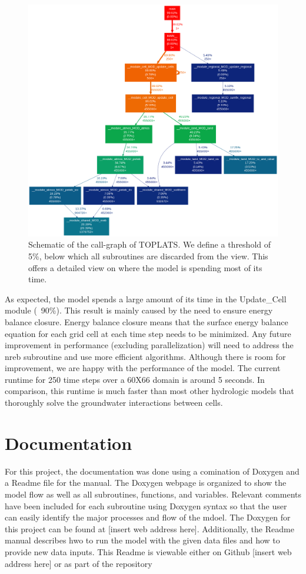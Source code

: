\documentclass[pdftex,12pt,a4paper]{article}
\begin{document}
\begin{figure}[h]
	\includegraphics[width=5.0in]{Figures/CallGraph.png}

	\caption{Schematic of the call-graph of TOPLATS. We define a threshold of 5\%, below which all subroutines are discarded from the view. This offers a detailed view on where the model is spending most of its time.}
	\label{Profiling1}
\end{figure}

As expected, the model spends a large amount of its time in the Update\_Cell module (~90\%). This result is mainly caused by the need to ensure energy balance closure. Energy balance closure means that the surface energy balance equation for each grid cell at each time step needs to be minimized. Any future improvement in performance (excluding parallelization) will need to address the nreb subroutine and use more efficient algorithms. Although there is room for improvement, we are happy with the performance of the model. The current runtime for 250 time steps over a 60X66 domain is around 5 seconds. In comparison, this runtime is much faster than most other hydrologic models that thoroughly solve the groundwater interactions between cells.

\section{Documentation}

For this project, the documentation was done using a comination of Doxygen and a Readme file for the manual. The Doxygen webpage is organized to show the model flow as well as all subroutines, functions, and variables. Relevant comments have been included for each subroutine using Doxygen syntax so that the user can easily identify the major processes and flow of the mdoel. The Doxygen for this project can be found at [insert web address here]. Additionally, the Readme manual describes hwo to run the model with the given data files and how to provide new data inputs. This Readme is viewable either on Github [insert web address here] or as part of the repository 
\end{document}
